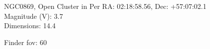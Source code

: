 \begin{block}{NGC0869, Open Cluster in Per}
    RA: 02:18:58.56, Dec: +57:07:02.1 \\ 
    Magnitude (V): 3.7 \\ 
    Dimensions: 14.4 

    Finder fov: 60 
\end{block}
